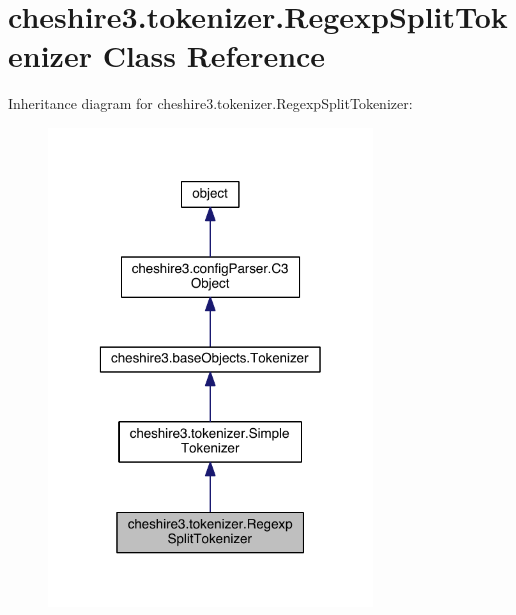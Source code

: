 \hypertarget{classcheshire3_1_1tokenizer_1_1_regexp_split_tokenizer}{\section{cheshire3.\-tokenizer.\-Regexp\-Split\-Tokenizer Class Reference}
\label{classcheshire3_1_1tokenizer_1_1_regexp_split_tokenizer}
}


Inheritance diagram for cheshire3.\-tokenizer.\-Regexp\-Split\-Tokenizer\-:
\nopagebreak
\begin{figure}[H]
\begin{center}
\leavevmode
\includegraphics[width=244pt]{classcheshire3_1_1tokenizer_1_1_regexp_split_tokenizer__inherit__graph}
\end{center}
\end{figure}


